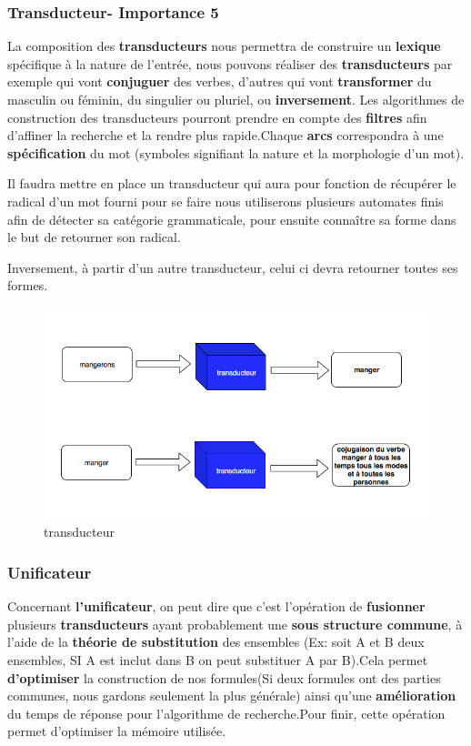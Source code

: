 \subsubsection{Transducteur- Importance 5}


La composition des \textbf{transducteurs} nous permettra de construire un \textbf{lexique} spécifique à la nature de l'entrée, nous pouvons réaliser des \textbf{transducteurs} par exemple qui vont \textbf{conjuguer} des verbes, d'autres qui vont \textbf{transformer} du masculin ou féminin, du singulier ou pluriel, ou \textbf{inversement}. Les algorithmes de construction des transducteurs pourront prendre en compte des \textbf{filtres} afin d'affiner la recherche et la rendre plus rapide.Chaque \textbf{arcs} correspondra à une \textbf{spécification} du mot (symboles signifiant la nature et la morphologie d'un mot).



{Il faudra mettre en place un transducteur qui aura pour fonction de récupérer le radical d'un mot fourni pour se faire nous utiliserons plusieurs automates finis afin de détecter sa catégorie grammaticale, pour ensuite connaître sa forme dans le but de retourner son radical.}

{Inversement, à partir d'un autre transducteur, celui ci devra retourner toutes ses formes.}

\begin{figure}[ht]
    \centering
    \includegraphics[scale=0.5]{transducteur.png}
    \caption{transducteur }
\end{figure}

\subsubsection{Unificateur}{
Concernant \textbf{l'unificateur}, on peut dire que c'est l'opération de \textbf{fusionner} plusieurs \textbf{transducteurs} ayant probablement une \textbf{sous structure commune}, à l'aide de la \textbf{théorie de substitution} des ensembles (Ex: soit A et B deux ensembles, SI A est inclut dans B on peut substituer A par B).Cela permet \textbf{d'optimiser} la construction de nos formules(Si deux formules ont des parties communes, nous gardons seulement la plus générale) ainsi qu'une \textbf{amélioration} du temps de réponse pour l'algorithme de recherche.Pour finir, cette opération permet d'optimiser la mémoire utilisée.}

